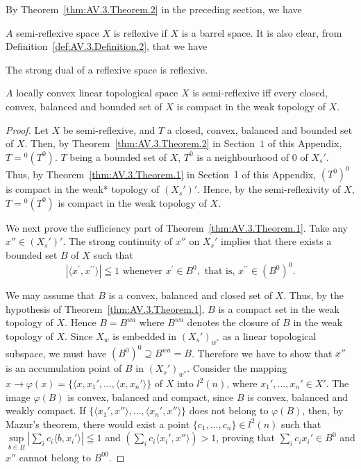 By Theorem~\ref{thm:AV.3.Theorem.2} in the preceding section, we have 

\begin{proposition}\label{prop:AV.3.Proposition.1} $A$ semi-reflexive space $X$ is reflexive if $X$ is a barrel space. It is also clear, from Definition~\ref{def:AV.3.Definition.2}, that we have 
\end{proposition}

\begin{proposition}\label{prop:AV.3.Proposition.2} The strong dual of a reflexive space is reflexive. 
\end{proposition}

\begin{theorem}\label{thm:AV.3.Theorem.1} $A$ locally convex linear topological space $X$ is semi-reflexive iff every closed, convex, balanced and bounded set of $X$ is compact in the weak topology of $X$. 
\end{theorem}

\begin{proof}
 Let $X$ be semi-reflexive, and $T$ a closed, convex, balanced and bounded set of $X$. Then, by Theorem~\ref{thm:AV.3.Theorem.2} in Section~\hyperref[sec:AV.1]{$1$} of this Appendix, $T = {}^0 (T^0)$. $T$ being a bounded set of $X$, $T^0$ is a neighbourhood of $0$ of $X_s'$. Thus, by Theorem~\ref{thm:AV.3.Theorem.1} in Section~\hyperref[sec:AV.1]{$1$} of this Appendix, $(T^0)^0$ is compact in the weak* topology of $(X_s')'$. Hence, by the semi-reflexivity of $X$, $T = {}^0 (T^0)$ is compact in the weak topology of $X$. 

We next prove the sufficiency part of Theorem~\ref{thm:AV.3.Theorem.1}. Take any $x'' \in (X_s')'$. The strong continuity of $x''$ on $X_s'$ implies that there exists a bounded set $B$ of $X$ such that 
\[
\left| \langle x ^{\prime}, x ^{\prime \prime} \rangle \right| \leqq 1 \text{ whenever } x ^{\prime} \in B ^{0}, \text{ that is, } x ^{\prime \prime} \in (B ^{0}) ^{0}.
\]

We may assume that $B$ is a convex, balanced and closed set of $X$. Thus, by the hypothesis of Theorem~\ref{thm:AV.3.Theorem.1}, $B$ is a compact set in the weak topology of $X$. Hence $B = B^{wa}$ where $B^{wa}$ denotes the closure of $B$ in the weak topology of $X$. Since $X_w$ is embedded in $(X_s')_{w^*}$ as a linear topological subspace, we must have $(B^0)^0 \supseteq B^{wa} = B$. Therefore we have to show that $x''$ is an accumulation point of $B$ in $(X_s')_{w^*}$. Consider the mapping $x \to \varphi(x) = \{\langle x, x_1', \ldots, \langle x, x_n'\rangle\}$ of $X$ into $l^2(n)$, where $x_1', \ldots, x_n' \in X'$. The image $\varphi(B)$ is convex, balanced and compact, since $B$ is convex, balanced and weakly compact. If $\{\langle x_1', x''\rangle, \ldots, \langle x_n', x''\rangle\}$ does not belong to $\varphi(B)$, then, by Mazur's theorem, there would exist a point $\{c_1, \ldots, c_n\} \in l^2(n)$ such that $\sup\limits_{b \in B} \left| \sum\limits_i c_i \langle b, x_i' \rangle \right| \leqq 1$ and $\left( \sum\limits_i c_i \langle x_i', x''\rangle \right) > 1$, proving that $\sum\limits_i c_i x_i' \in B^0$ and $x''$ cannot belong to $B^{00}$. 
\end{proof}

